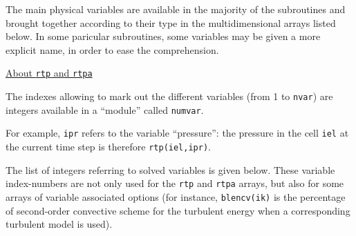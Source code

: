 {{{





The main physical variables are available in the majority of the
subroutines and brought together according to their type in the
multidimensional arrays listed below. In some paricular subroutines,
some variables may be given a more explicit name, in order to ease the
comprehension.






\bigskip

\underline{About \texttt{rtp} and \texttt{rtpa}}

The indexes allowing to mark out the different variables (from 1 to
\texttt{nvar}) are integers available in a ``module'' called
\texttt{numvar}.

For example, \texttt{ipr} refers to the variable ``pressure'':
the pressure in the cell \texttt{iel} at the current time step is
therefore \texttt{rtp(iel,ipr)}.

The list of integers referring to solved variables is given below. These
variable index-numbers are not only used for the \texttt{rtp} and
\texttt{rtpa} arrays, but also for some arrays of variable associated options
(for instance, \texttt{blencv(ik)} is the percentage of second-order
convective scheme for the turbulent energy
when a corresponding turbulent model is used).

}}}
